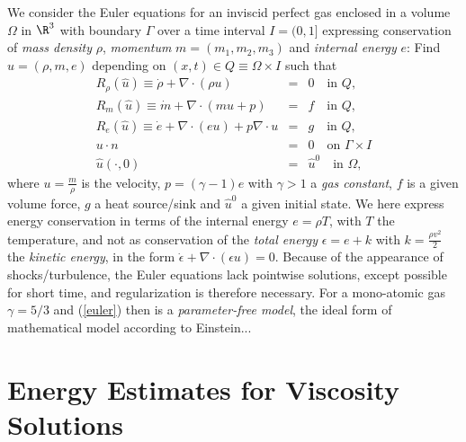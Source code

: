 We consider the Euler equations for an inviscid perfect gas enclosed
in a volume $\Omega$ in $\R^3$ with boundary $\Gamma$ over a time
interval $I=(0,1]$ expressing conservation of \emph{mass density}
$\rho$, \emph{momentum} $m=(m_1,m_2,m_3)$ and \emph{internal energy}
$e$: Find $\hat u=(\rho ,m,e)$ depending on $(x,t)\in Q\equiv
\Omega\times I$ such that
\begin{equation}\label{euler}
\begin{array}{rcl}
R_\rho (\hat u)\equiv\dot \rho +\nabla\cdot (\rho u )&=&  0 \quad \mbox{in } Q, \\
R_m(\hat u)\equiv\dot m +\nabla\cdot (mu +p)&=&  f \quad \mbox{in } Q, \\
R_e(\hat u)\equiv\dot e +\nabla\cdot (eu)+p\nabla\cdot u &=& g  \quad \mbox{in } Q,\\ 
u\cdot n&=&0\quad \mbox{on } \Gamma\times I\\
\hat u(\cdot ,0)&=&\hat u^0\quad \mbox{in } \Omega , 
\end{array} 
\end{equation}
where $u=\frac{m}{\rho}$ is the velocity, $p=(\gamma -1)e$ with
$\gamma >1$ a \emph{gas constant}, $f$ is a given volume force, $g$ a
heat source/sink and $\hat u^0$ a given initial state. We here express
energy conservation in terms of the internal energy $e=\rho T$, with
$T$ the temperature, and not as conservation of the \emph{total
energy} $\epsilon =e+k$ with $k=\frac{\rho v^2}{2}$ the \emph{kinetic
energy}, in the form $\dot\epsilon +\nabla\cdot (\epsilon u)=
0$. Because of the appearance of shocks/turbulence, the Euler
equations lack pointwise solutions, except possible for short time,
and regularization is therefore necessary. For a mono-atomic gas
$\gamma =5/3$ and (\ref{euler}) then is a \emph{parameter-free model},
the ideal form of mathematical model according to Einstein...

\section{Energy Estimates for Viscosity Solutions}

